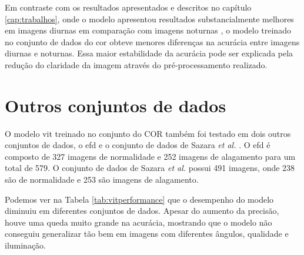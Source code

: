
Em contraste com os resultados apresentados e descritos no capítulo \ref{cap:trabalhos}, 
onde o modelo apresentou resultados substancialmente melhores em imagens diurnas em comparação com imagens noturnas \cite{piedad2022},
o modelo treinado no conjunto de dados do \acrshort{cor} obteve menores diferenças na acurácia entre imagens diurnas e noturnas.
Essa maior estabilidade da acurácia pode ser explicada pela redução do claridade da imagem através do pré-processamento realizado.
\section{Outros conjuntos de dados}\label{sec:resultados_outros}

O modelo \acrshort{vit} treinado no conjunto do COR também foi testado em dois outros conjuntos de dados, 
o \acrfull{efd} \cite{BarzSchroeterMuench2018_1000117723} e o conjunto de dados de Sazara \textit{et al.} \cite{sazara2019}.
O \acrshort{efd} é composto de 327 imagens de normalidade e 252 imagens de alagamento para um total de 579.
O conjunto de dados de Sazara \textit{et al.} possui 491 imagens, onde 238 são de normalidade e 253 são imagens de alagamento.

Podemos ver na Tabela \ref{tab:vitperformance} que o desempenho do modelo diminuiu em diferentes conjuntos de dados. 
Apesar do aumento da precisão, houve uma queda muito grande na acurácia, mostrando que o modelo não conseguiu generalizar tão bem em imagens com diferentes ângulos, qualidade e iluminação.

